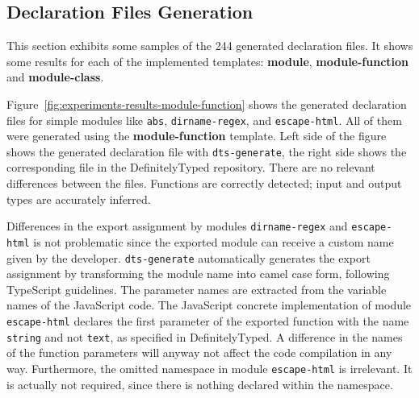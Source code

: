 \documentclass[a4paper,english,cleveref, autoref]{lipics-v2019}
\newcommand{\figref}[1]{Figure~\ref{#1}}
\begin{document}
\subsection{Declaration Files Generation}
\label{sec:experiments-declaration-files-generation}

This section exhibits some samples of the 244 generated
declaration files. It shows some results for each of the implemented
templates: \textbf{module}, \textbf{module-function} and
\textbf{module-class}. 

\figref{fig:experiments-results-module-function} shows the generated
declaration files for simple modules like \texttt{abs},
\texttt{dirname-regex}, and \texttt{escape-html}. All of them were
generated using the \textbf{module-function} template. Left side of the figure shows the generated declaration file with
\lstinline{dts-generate}, the right side shows the corresponding file
in the DefinitelyTyped repository. There are no relevant
differences between the files. Functions are correctly detected; input and output types are accurately inferred.


Differences in the export assignment by modules \texttt{dirname-regex} and \texttt{escape-html} is not problematic since the exported module can receive a custom name given by the developer. \texttt{dts-generate} automatically generates the export assignment by transforming the module name into camel case form, following TypeScript guidelines. The parameter names are extracted from the variable names of the JavaScript code. The JavaScript concrete implementation of module \texttt{escape-html} declares the first parameter of the exported function with the name \texttt{string} and not \texttt{text}, as specified in DefinitelyTyped. A difference in the names of the function parameters will anyway not affect the code compilation in any way. Furthermore, the omitted namespace in module \texttt{escape-html} is irrelevant. It is actually not required, since there is nothing declared within the namespace.
 
\end{document}
